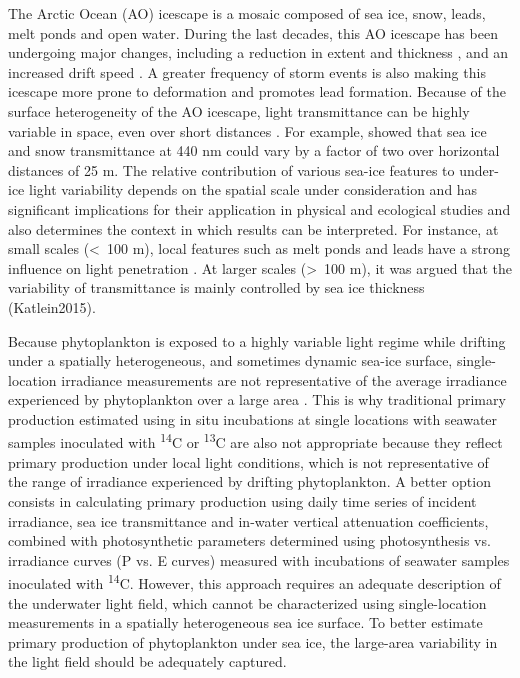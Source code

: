 \documentclass[draft]{agujournal2018}
\begin{document}
The Arctic Ocean (AO) icescape is a mosaic composed of sea ice, snow, leads, melt ponds and open water. During the last decades, this AO icescape has been undergoing major changes, including a reduction in extent and thickness \citep{Meier2014}, and an increased drift speed \citep{Kwok2013}. A greater frequency of storm events is also making this icescape more prone to deformation \citep{Itkin2017} and promotes lead formation. Because of the surface heterogeneity of the AO icescape, light transmittance can be highly variable in space, even over short distances \citep{Nicolaus2013b, Katlein2015, Hancke2018}. For example, \citet{Perovich1998} showed that sea ice and snow transmittance at 440 nm could vary by a factor of two over horizontal distances of 25 m. The relative contribution of various sea-ice features to under-ice light variability depends on the spatial scale under consideration and has significant implications for their application in physical and ecological studies and also determines the context in which results can be interpreted. For instance, at small scales (\textless~100 m), local features such as melt ponds and leads have a strong influence on light penetration \citep{Frey2011, Katlein2016, Massicotte2018}. At larger scales (\textgreater~100 m), it was argued that the variability of transmittance is mainly controlled by sea ice thickness (Katlein2015).

Because phytoplankton is exposed to a highly variable light regime while drifting under a spatially heterogeneous, and sometimes dynamic sea-ice surface, single-location irradiance measurements are not representative of the average irradiance experienced by phytoplankton over a large area \citep{Katlein2016, Lange2017}. This is why traditional primary production estimated using in situ incubations at single locations with seawater samples inoculated with \textsuperscript{14}C or \textsuperscript{13}C are also not appropriate because they reflect primary production under local light conditions, which is not representative of the range of irradiance experienced by drifting phytoplankton. A better option consists in calculating primary production using daily time series of incident irradiance, sea ice transmittance and in-water vertical attenuation coefficients, combined with photosynthetic parameters determined using photosynthesis vs. irradiance curves (P vs. E curves) measured with incubations of seawater samples inoculated with \textsuperscript{14}C. However, this approach requires an adequate description of the underwater light field, which cannot be characterized using single-location measurements in a spatially heterogeneous sea ice surface. To better estimate primary production of phytoplankton under sea ice,  the large-area variability in the light field should be adequately captured.
\end{document}
